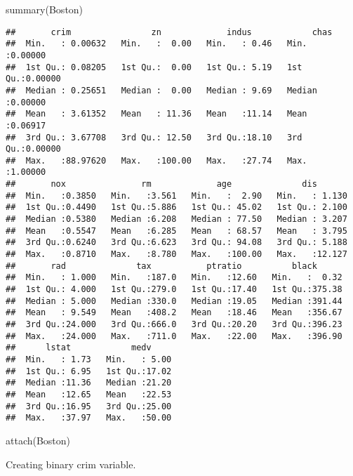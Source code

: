 \documentclass[
]{article}
\newenvironment{Shaded}{\begin{snugshade}}{\end{snugshade}}
\newcommand{\FunctionTok}[1]{\textcolor[rgb]{0.00,0.00,0.00}{#1}}
\newcommand{\NormalTok}[1]{#1}
\begin{document}
\begin{Shaded}
\begin{Highlighting}[]
\FunctionTok{summary}\NormalTok{(Boston)}
\end{Highlighting}
\end{Shaded}

\begin{verbatim}
##       crim                zn             indus            chas        
##  Min.   : 0.00632   Min.   :  0.00   Min.   : 0.46   Min.   :0.00000  
##  1st Qu.: 0.08205   1st Qu.:  0.00   1st Qu.: 5.19   1st Qu.:0.00000  
##  Median : 0.25651   Median :  0.00   Median : 9.69   Median :0.00000  
##  Mean   : 3.61352   Mean   : 11.36   Mean   :11.14   Mean   :0.06917  
##  3rd Qu.: 3.67708   3rd Qu.: 12.50   3rd Qu.:18.10   3rd Qu.:0.00000  
##  Max.   :88.97620   Max.   :100.00   Max.   :27.74   Max.   :1.00000  
##       nox               rm             age              dis        
##  Min.   :0.3850   Min.   :3.561   Min.   :  2.90   Min.   : 1.130  
##  1st Qu.:0.4490   1st Qu.:5.886   1st Qu.: 45.02   1st Qu.: 2.100  
##  Median :0.5380   Median :6.208   Median : 77.50   Median : 3.207  
##  Mean   :0.5547   Mean   :6.285   Mean   : 68.57   Mean   : 3.795  
##  3rd Qu.:0.6240   3rd Qu.:6.623   3rd Qu.: 94.08   3rd Qu.: 5.188  
##  Max.   :0.8710   Max.   :8.780   Max.   :100.00   Max.   :12.127  
##       rad              tax           ptratio          black       
##  Min.   : 1.000   Min.   :187.0   Min.   :12.60   Min.   :  0.32  
##  1st Qu.: 4.000   1st Qu.:279.0   1st Qu.:17.40   1st Qu.:375.38  
##  Median : 5.000   Median :330.0   Median :19.05   Median :391.44  
##  Mean   : 9.549   Mean   :408.2   Mean   :18.46   Mean   :356.67  
##  3rd Qu.:24.000   3rd Qu.:666.0   3rd Qu.:20.20   3rd Qu.:396.23  
##  Max.   :24.000   Max.   :711.0   Max.   :22.00   Max.   :396.90  
##      lstat            medv      
##  Min.   : 1.73   Min.   : 5.00  
##  1st Qu.: 6.95   1st Qu.:17.02  
##  Median :11.36   Median :21.20  
##  Mean   :12.65   Mean   :22.53  
##  3rd Qu.:16.95   3rd Qu.:25.00  
##  Max.   :37.97   Max.   :50.00
\end{verbatim}

\begin{Shaded}
\begin{Highlighting}[]
\FunctionTok{attach}\NormalTok{(Boston)}
\end{Highlighting}
\end{Shaded}

Creating binary crim variable.
\end{document}
